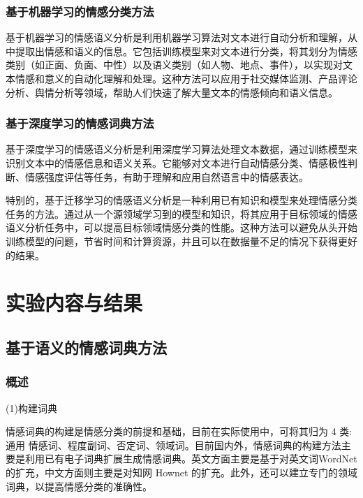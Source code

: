 \documentclass[hyperref,a4paper,UTF8]{ctexart}
\begin{document}
\subsubsection{基于机器学习的情感分类方法}

基于机器学习的情感语义分析是利用机器学习算法对文本进行自动分析和理解，从中提取出情感和语义的信息。它包括训练模型来对文本进行分类，将其划分为情感类别（如正面、负面、中性）以及语义类别（如人物、地点、事件），以实现对文本情感和意义的自动化理解和处理。这种方法可以应用于社交媒体监测、产品评论分析、舆情分析等领域，帮助人们快速了解大量文本的情感倾向和语义信息。\cite{DBLP:journals/widm/ZhangWL18}

\subsubsection{基于深度学习的情感词典方法}

基于深度学习的情感语义分析是利用深度学习算法处理文本数据，通过训练模型来识别文本中的情感信息和语义关系。它能够对文本进行自动情感分类、情感极性判断、情感强度评估等任务，有助于理解和应用自然语言中的情感表达。


特别的，基于迁移学习的情感语义分析是一种利用已有知识和模型来处理情感分类任务的方法。通过从一个源领域学习到的模型和知识，将其应用于目标领域的情感语义分析任务中，可以提高目标领域情感分类的性能。这种方法可以避免从头开始训练模型的问题，节省时间和计算资源，并且可以在数据量不足的情况下获得更好的结果。


\section{实验内容与结果}

\subsection{基于语义的情感词典方法}

\subsubsection{概述}

(1)构建词典


情感词典的构建是情感分类的前提和基础，目前在实际使用中，可将其归为 4 类:通用 情感词、程度副词、否定词、领域词。目前国内外，情感词典的构建方法主要是利用已有电子词典扩展生成情感词典。英文方面主要是基于对英文词WordNet 的扩充，中文方面则主要是对知网 Hownet 的扩充。此外，还可以建立专门的领域词典，以提高情感分类的准确性。
\end{document}
